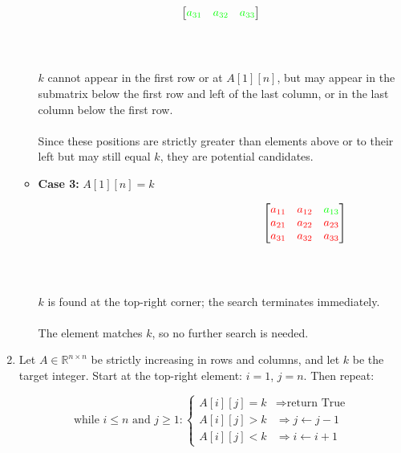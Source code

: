 \documentclass[12pt]{article}
\begin{document}
\begin{enumerate}
\begin{itemize}
\begin{varwidth}{\textwidth}
\[\begin{bmatrix}
        \textcolor{green}{a_{31}} & \textcolor{green}{a_{32}} & \textcolor{green}{a_{33}}
        \end{bmatrix}
        \] \\
        \end{varwidth}
        \\ 
        $k$ cannot appear in the first row or at $A[1][n]$, but may appear in the submatrix below the first row and left of the last column, or in the last column below the first row.  
        \\\\ Since these positions are strictly greater than elements above or to their left but may still equal $k$, they are potential candidates.
        \item \textbf{Case 3:} $A[1][n] = k$ \\
        \begin{varwidth}{\textwidth}
        \[ \hspace{15em}
        \begin{bmatrix}
        \textcolor{red}{a_{11}} & \textcolor{red}{a_{12}} & \textcolor{green}{a_{13}} \\
        \textcolor{red}{a_{21}} & \textcolor{red}{a_{22}} & \textcolor{red}{a_{23}} \\
        \textcolor{red}{a_{31}} & \textcolor{red}{a_{32}} & \textcolor{red}{a_{33}}
        \end{bmatrix}
        \] \\
        \end{varwidth}
        \\ 
         $k$ is found at the top-right corner; the search terminates immediately.  
        \\\\ The element matches $k$, so no further search is needed. \newpage
    \end{itemize} 

    \item 
    Let $A \in \mathbb{R}^{n \times n}$ be strictly increasing in rows and columns, and let $k$ be the target integer.  
    Start at the top-right element: $i = 1$, $j = n$. Then repeat:

    \[
    \text{while } i \le n \text{ and } j \ge 1:
    \begin{cases}
    A[i][j] = k &\Rightarrow \text{return True} \\
    A[i][j] > k &\Rightarrow j \gets j - 1 \\
    A[i][j] < k &\Rightarrow i \gets i + 1
    \end{cases}
    \]


\end{enumerate}
\end{document}
